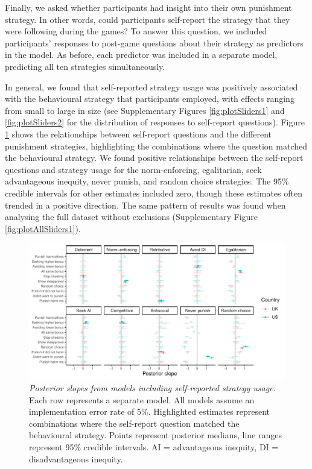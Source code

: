 \documentclass[
  man,floatsintext]{apa6}
\begin{document}
Finally, we asked whether participants had insight into their own punishment
strategy. In other words, could participants self-report the strategy that they
were following during the games? To answer this question, we included
participants' responses to post-game questions about their strategy as
predictors in the model. As before, each predictor was included in a separate
model, predicting all ten strategies simultaneously.

In general, we found that self-reported strategy usage was positively associated
with the behavioural strategy that participants employed, with effects ranging
from small to large in size (see Supplementary Figures \ref{fig:plotSliders1}
and \ref{fig:plotSliders2} for the distribution of responses to self-report
questions). Figure \ref{fig:plotAllSliders2} shows the relationships between
self-report questions and the different punishment strategies, highlighting the
combinations where the question matched the behavioural strategy. We found
positive relationships between the self-report questions and strategy usage for
the norm-enforcing, egalitarian, seek advantageous inequity, never punish, and
random choice strategies. The 95\% credible intervals for other estimates
included zero, though these estimates often trended in a positive direction. The
same pattern of results was found when analysing the full dataset without
exclusions (Supplementary Figure \ref{fig:plotAllSliders1}).








\begin{figure}
\centering
\includegraphics{manuscript_files/figure-latex/plotAllSliders2-1.pdf}
\caption{\label{fig:plotAllSliders2}\emph{Posterior slopes from models including
self-reported strategy usage.} Each row represents a separate model. All models
assume an implementation error rate of 5\%. Highlighted estimates represent
combinations where the self-report question matched the behavioural strategy.
Points represent posterior medians, line ranges represent 95\% credible
intervals. AI = advantageous inequity, DI = disadvantageous inequity.}
\end{figure}
\end{document}
